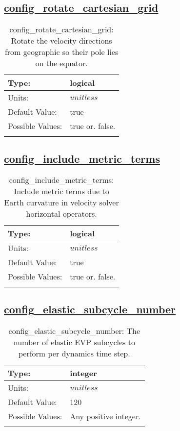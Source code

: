 \subsection[config\_rotate\_cartesian\_grid]{\hyperref[sec:nm_tab_velocity_solver]{config\_rotate\_cartesian\_grid}}
\label{subsec:nm_sec_config_rotate_cartesian_grid}
\begin{center}
\begin{longtable}{| p{2.0in} || p{4.0in} |}
    \hline
    Type: & logical \\
    \hline
    Units: & $unitless$ \\
    \hline
    Default Value: & true \\
    \hline
    Possible Values: & true or. false. \\
    \hline
    \caption{config\_rotate\_cartesian\_grid: Rotate the velocity directions from geographic so their pole lies on the equator.}
\end{longtable}
\end{center}
\subsection[config\_include\_metric\_terms]{\hyperref[sec:nm_tab_velocity_solver]{config\_include\_metric\_terms}}
\label{subsec:nm_sec_config_include_metric_terms}
\begin{center}
\begin{longtable}{| p{2.0in} || p{4.0in} |}
    \hline
    Type: & logical \\
    \hline
    Units: & $unitless$ \\
    \hline
    Default Value: & true \\
    \hline
    Possible Values: & true or. false. \\
    \hline
    \caption{config\_include\_metric\_terms: Include metric terms due to Earth curvature in velocity solver horizontal operators.}
\end{longtable}
\end{center}
\subsection[config\_elastic\_subcycle\_number]{\hyperref[sec:nm_tab_velocity_solver]{config\_elastic\_subcycle\_number}}
\label{subsec:nm_sec_config_elastic_subcycle_number}
\begin{center}
\begin{longtable}{| p{2.0in} || p{4.0in} |}
    \hline
    Type: & integer \\
    \hline
    Units: & $unitless$ \\
    \hline
    Default Value: & 120 \\
    \hline
    Possible Values: & Any positive integer. \\
    \hline
    \caption{config\_elastic\_subcycle\_number: The number of elastic EVP subcycles to perform per dynamics time step.}
\end{longtable}
\end{center}
